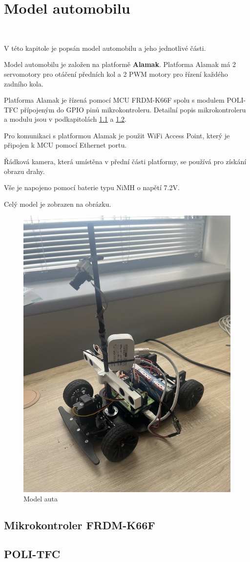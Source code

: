 \chapter{Model automobilu}
\label{sec:CarModel} \

V této kapitole je popsán model automobilu a jeho jednotlivé části.

Model automobilu je založen na platformě \textbf{Alamak}.
Platforma Alamak má 2 servomotory pro otáčení předních kol a 2 PWM motory pro řízení každého
zadního kola.

Platforma Alamak je řízená pomocí MCU FRDM-K66F\cite{frdmk66UserGuide} spolu
s modulem POLI-TFC přípojeným do GPIO pinů mikrokontroleru.
Detailní popis mikrokontroleru a modulu jsou v podkapitolách \ref{sec:FRDM-K66F} a \ref{sec:POLI-TFC}.

Pro komunikaci s platformou Alamak je použit WiFi Access Point, který je připojen k MCU
pomocí Ethernet portu.

Řádková kamera, která umístěna v přední části platformy, se používá pro získání obrazu drahy.

Vše je napojeno pomocí baterie typu NiMH o napětí 7.2V.

Celý model je zobrazen na obrázku.
\begin{figure}[h]
    \centering
    \includegraphics[width=0.45\linewidth, angle=-90]{Figures/car.jpeg}
    \caption{Model auta}
    \label{fig:1}
\end{figure}

\section{Mikrokontroler FRDM-K66F}
\label{sec:FRDM-K66F}

\section{POLI-TFC}
\label{sec:POLI-TFC}

\endinput
